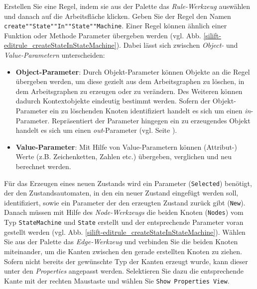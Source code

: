 \documentclass[a4paper]{scrartcl}
\begin{document}
Erstellen Sie eine Regel, indem sie aus der Palette das \textit{Rule-Werkzeug} auswählen und danach auf die Arbeitsfläche klicken. Geben Sie der Regel den Namen \texttt{create""State""In""State""Machine}.
Einer Regel können ähnlich einer Funktion oder Methode Parameter übergeben werden (vgl. Abb. \ref{silift-editrule_createStateInStateMachine}).
Dabei lässt sich zwischen \textit{Object-} und \textit{Value-Parametern} unterscheiden:

\begin{itemize}

\item \textbf{Object-Parameter}: 
Durch Objekt-Parameter können Objekte an die Regel über\-ge\-ben werden, um diese gezielt aus dem Arbeitsgraphen zu löschen, in dem Arbeitsgraphen zu erzeugen oder zu verändern.
Des Weiteren können dadurch Kontextobjekte eindeutig bestimmt werden. 
Sofern der Objekt-Parameter ein zu löschenden Knoten identifiziert handelt es sich um einen \textit{in}-Parameter.
Repräsentiert der Parameter hingegen ein zu erzeugendes Objekt handelt es sich um einen \textit{out}-Parameter (vgl. Seite \pageref{in/out_parameter}).

\item \textbf{Value-Parameter}: Mit Hilfe von Value-Parametern können (Attribut-) Werte (z.B. Zeichenketten, Zahlen etc.) übergeben, verglichen und neu berechnet werden.
\end{itemize}

Für das Erzeugen eines neuen Zustands wird ein Parameter (\texttt{Selected}) benötigt, der den Zustandsautomaten, in den ein neuer Zustand eingefügt werden soll, identifiziert, sowie ein Parameter der den erzeugten Zustand zurück gibt (\texttt{New}).\\
Danach müssen mit Hilfe des \textit{Node-Werkzeugs} die beiden Knoten (\texttt{Nodes}) vom Typ \texttt{StateMachine} und \texttt{State} erstellt und der entsprechende Parameter voran gestellt werden (vgl. Abb. \ref{silift-editrule_createStateInStateMachine}).
Wählen Sie aus der Palette das \textit{Edge-Werkzeug} und verbinden Sie die beiden Knoten miteinander, um die Kanten zwischen den gerade erstellten Knoten zu ziehen.
Sofern nicht bereits der gewünschte Typ der Kanten erzeugt wurde, kann dieser unter den \textit{Properties} angepasst werden. 
Selektieren Sie dazu die entsprechende Kante mit der rechten Maustaste und wählen Sie \texttt{Show Properties View}.\\
\end{document}
